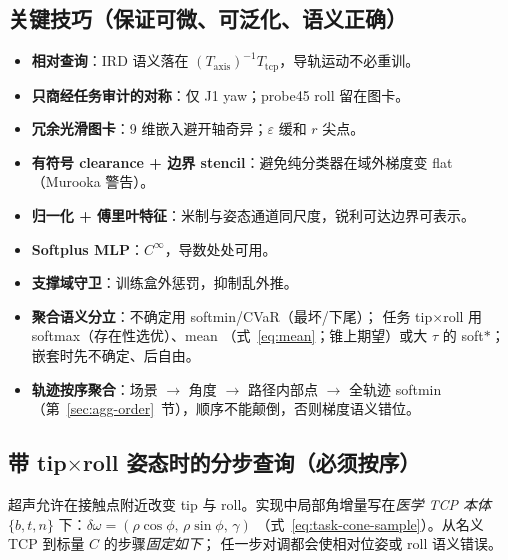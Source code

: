 \documentclass[UTF8,a4paper,11pt,fontset=fandol]{ctexart}
\newcommand{\Tcp}{T_{\mathrm{tcp}}}
\newcommand{\Taxis}{T_{\mathrm{axis}}}
\begin{document}
\subsection{关键技巧（保证可微、可泛化、语义正确）}
\label{sec:tricks}

\begin{itemize}[leftmargin=1.4em]
  \item \textbf{相对查询}：IRD 语义落在 \((\Taxis)^{-1}\Tcp\)，导轨运动不必重训。
  \item \textbf{只商经任务审计的对称}：仅 J1 yaw；probe45 roll 留在图卡。
  \item \textbf{冗余光滑图卡}：9 维嵌入避开轴奇异；\(\varepsilon\) 缓和 \(r\) 尖点。
  \item \textbf{有符号 clearance + 边界 stencil}：避免纯分类器在域外梯度变 flat
        （Murooka 警告）。
  \item \textbf{归一化 + 傅里叶特征}：米制与姿态通道同尺度，锐利可达边界可表示。
  \item \textbf{Softplus MLP}：\(C^{\infty}\)，导数处处可用。
  \item \textbf{支撑域守卫}：训练盒外惩罚，抑制乱外推。
  \item \textbf{聚合语义分立}：不确定用 softmin/CVaR（最坏/下尾）；
        任务 tip$\times$roll 用 softmax（存在性选优）、mean
        （式~\eqref{eq:mean}；锥上期望）或大 \(\tau\) 的 soft\(*\)；
        嵌套时先不确定、后自由。
  \item \textbf{轨迹按序聚合}：场景 \(\to\) 角度 \(\to\) 路径内部点 \(\to\) 全轨迹 softmin
        （第~\ref{sec:agg-order}~节），顺序不能颠倒，否则梯度语义错位。
\end{itemize}

\subsection{带 tip$\times$roll 姿态时的分步查询（必须按序）}
\label{sec:tip-roll-pipeline}

超声允许在接触点附近改变 tip 与 roll。实现中局部角增量写在\emph{医学 TCP 本体}
\(\{b,t,n\}\) 下：\(\delta\omega=(\rho\cos\phi,\,\rho\sin\phi,\,\gamma)\)
（式~\eqref{eq:task-cone-sample}）。从名义 TCP 到标量 \(C\) 的步骤\emph{固定如下}；
任一步对调都会使相对位姿或 roll 语义错误。
\end{document}
